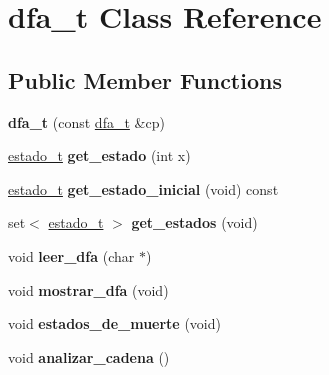 \hypertarget{classdfa__t}{\section{dfa\-\_\-t Class Reference}
\label{classdfa__t}
}
\subsection*{Public Member Functions}
\begin{DoxyCompactItemize}
\item 
\hypertarget{classdfa__t_a4805bccab2069121d884099be9793d6b}{{\bfseries dfa\-\_\-t} (const \hyperlink{classdfa__t}{dfa\-\_\-t} \&cp)}\label{classdfa__t_a4805bccab2069121d884099be9793d6b}

\item 
\hypertarget{classdfa__t_ada3ce10114c38f69ffec02e2bd6146d0}{\hyperlink{classestado__t}{estado\-\_\-t} {\bfseries get\-\_\-estado} (int x)}\label{classdfa__t_ada3ce10114c38f69ffec02e2bd6146d0}

\item 
\hypertarget{classdfa__t_ad70713c943798d316b729f17bf038c31}{\hyperlink{classestado__t}{estado\-\_\-t} {\bfseries get\-\_\-estado\-\_\-inicial} (void) const }\label{classdfa__t_ad70713c943798d316b729f17bf038c31}

\item 
\hypertarget{classdfa__t_abbcaa27f231786ca144cf661d94a9ae9}{set$<$ \hyperlink{classestado__t}{estado\-\_\-t} $>$ {\bfseries get\-\_\-estados} (void)}\label{classdfa__t_abbcaa27f231786ca144cf661d94a9ae9}

\item 
\hypertarget{classdfa__t_a88ffcdc1176570cc64bf97978b227f29}{void {\bfseries leer\-\_\-dfa} (char $\ast$)}\label{classdfa__t_a88ffcdc1176570cc64bf97978b227f29}

\item 
\hypertarget{classdfa__t_a9169367d64f83fd0e0d7ffcb19718c8a}{void {\bfseries mostrar\-\_\-dfa} (void)}\label{classdfa__t_a9169367d64f83fd0e0d7ffcb19718c8a}

\item 
\hypertarget{classdfa__t_a7163af6ae4232618706a4fac9e106bd1}{void {\bfseries estados\-\_\-de\-\_\-muerte} (void)}\label{classdfa__t_a7163af6ae4232618706a4fac9e106bd1}

\item 
\hypertarget{classdfa__t_acff6a18bcad71995e2c10a532cc63ec2}{void {\bfseries analizar\-\_\-cadena} ()}\label{classdfa__t_acff6a18bcad71995e2c10a532cc63ec2}


\end{DoxyCompactItemize}
